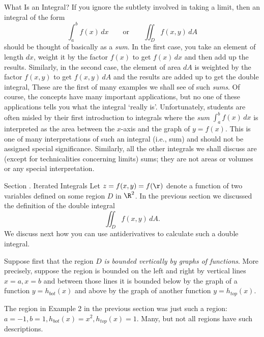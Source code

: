 \subhead What Is an Integral? \endsubhead
If you ignore the subtlety involved in taking a limit, then an
integral of the form
$$
\int_a^b f(x)\,dx \qquad\text{or}\qquad \iint_D f(x,y)\,dA
$$
should be thought of basically as a {\it sum}.   In the first case,
you take an element of length $dx$, weight it by the factor
$f(x)$ to get $f(x)\,dx$ and then add up the results.  Similarly,
in the second case, the element of area $dA$ is weighted by the
factor $f(x,y)$ to get $f(x,y)\,dA$ and the results are added
up to get the double integral,   These are the first of many examples
we shall see of such {\it sums}.  Of course, the concepts have many
important applications, but no one of these applications tells you what
the integral `really is'.   Unfortunately, students are often misled
by their first introduction to integrals where the {\it sum\/}
$\int_a^b f(x)\,dx$ is interpreted as the area between the $x$-axis
and the graph of $y = f(x)$.   This is one of many interpretations
of such an integral (i.e., sum) and should not be assigned
special significance.   Similarly, all the other integrals we
shall discuss are (except for technicalities concerning limits)
sums; they are not areas or volumes or any special interpretation.


\bigskip
\bigskip


\head Section \sn. Iterated Integrals \endhead
Let $z = f(x,y) = f(\r)$ denote a function of two variables defined
on some region $D$ in $\R^2$.   In the previous section we discussed
the definition of the double integral
$$
\iint_D f(x,y) \,dA.
$$
%
We discuss next how you can use antiderivatives to calculate such
a double integral.

	Suppose first that the region $D$  {\it is bounded 
vertically
by graphs of functions}.   More precisely, suppose the region is bounded
%
on the left and right by vertical lines $x = a, x= b$ and between
those lines it is bounded
below by the graph of a function
$y = h_{bot}(x)$ and
 above by the graph of another function
$y = h_{top}(x)$. 
\medskip
\centerline{}
\medskip
The region in Example 2 in the previous section was just such a
region:  
$a = -1, b = 1, h_{bot}(x) = x^2, h_{top}(x) = 1$. 
Many, but not all regions have such descriptions.

